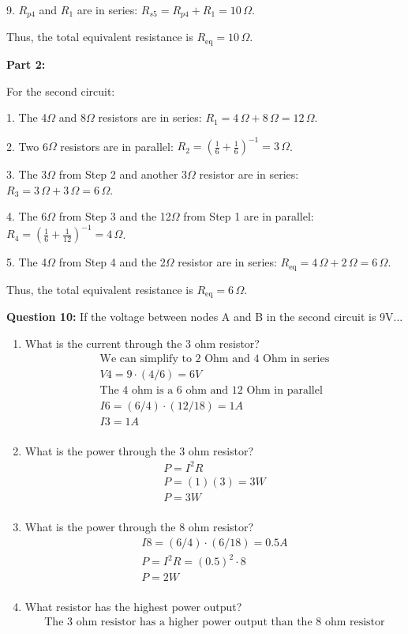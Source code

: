 \documentclass{article}
\begin{document}
9. \( R_{p4} \) and \( R_1 \) are in series:  
   \( R_{s5} = R_{p4} + R_1 = 10 \, \Omega \).

Thus, the total equivalent resistance is \( R_{\text{eq}} = 10 \, \Omega \).

\bigskip

\textbf{Part 2:}

For the second circuit:

1. The 4$\Omega$ and 8$\Omega$ resistors are in series:  
   \( R_1 = 4 \, \Omega + 8 \, \Omega = 12 \, \Omega \).

2. Two 6$\Omega$ resistors are in parallel:  
   \( R_2 = \left( \frac{1}{6} + \frac{1}{6} \right)^{-1} = 3 \, \Omega \).

3. The 3$\Omega$ from Step 2 and another 3$\Omega$ resistor are in series:  
   \( R_3 = 3 \, \Omega + 3 \, \Omega = 6 \, \Omega \).

4. The 6$\Omega$ from Step 3 and the 12$\Omega$ from Step 1 are in parallel:  
   \( R_4 = \left( \frac{1}{6} + \frac{1}{12} \right)^{-1} = 4 \, \Omega \).

5. The 4$\Omega$ from Step 4 and the 2$\Omega$ resistor are in series:  
   \( R_{\text{eq}} = 4 \, \Omega + 2 \, \Omega = 6 \, \Omega \).

Thus, the total equivalent resistance is \( R_{\text{eq}} = 6 \, \Omega \).
\bigskip


\textbf{Question 10:} If the voltage between nodes A and B in the second circuit is 9V...
\begin{enumerate}
\item What is the current through the 3 ohm resistor?
\begin{align*}
    \text{We can simplify to 2 Ohm and 4 Ohm in series}\\
    V4 = 9 \cdot (4/6) = 6 V\\
    \text{The 4 ohm is a 6 ohm and 12 Ohm in parallel}\\
    I6 = (6/4)\cdot(12/18) = 1A\\
    \boxed{I3 = 1 A}\\
\end{align*}
\item What is the power through the 3 ohm resistor?
\begin{align*}
    P = I^{2}R\\
    P = (1)(3) = 3W\\
    \boxed{P = 3W}\\
\end{align*}
\item What is the power through the 8 ohm resistor?
\begin{align*}
   I8 = (6/4)\cdot (6/18) = 0.5 A\\
    P = I^{2}R = (0.5)^{2} \cdot 8\\
   \boxed{P = 2W}\\
\end{align*}
\item What resistor has the highest power output?
\begin{align*}
   \text{The 3 ohm resistor has a higher power output than the 8 ohm resistor}
\end{align*}
\end{enumerate}
\end{document}
